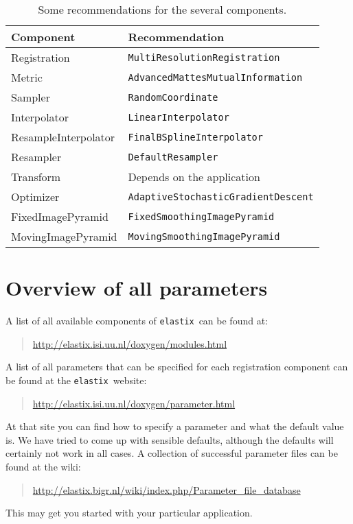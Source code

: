 \documentclass[]{report}
\newcommand{\elastix}{\texttt{elastix}}
\begin{document}
\begin{table}[htb]
\centering
\begin{tabular}{l|p{15em}}
\textbf{Component} & \textbf{Recommendation} \\
\hline
Registration & \texttt{MultiResolutionRegistration} \\
Metric       & \texttt{AdvancedMattesMutualInformation} \\
Sampler      & \texttt{RandomCoordinate} \\
Interpolator & \texttt{LinearInterpolator} \\
ResampleInterpolator & \texttt{FinalBSplineInterpolator} \\
Resampler    & \texttt{DefaultResampler}\\
Transform    & Depends on the application \\
Optimizer    & \texttt{AdaptiveStochasticGradientDescent} \\
FixedImagePyramid   & \texttt{FixedSmoothingImagePyramid} \\
MovingImagePyramid  & \texttt{MovingSmoothingImagePyramid} \\
\end{tabular}
\caption{Some recommendations for the several components.}\label{table:tutorial:components}
\end{table}

\section{Overview of all parameters}

A list of all available components of \elastix\ can be found at:
\begin{quote}
\url{http://elastix.isi.uu.nl/doxygen/modules.html}
\end{quote}
A list of all parameters that can be specified for each registration
component can be found at the \elastix\ website:
\begin{quote}
\url{http://elastix.isi.uu.nl/doxygen/parameter.html}
\end{quote}
At that site you can find how to specify a parameter and what the
default value is. We have tried to come up with sensible defaults,
although the defaults will certainly not work in all cases. A
collection of successful parameter files can be found at the wiki:
\begin{quote}
\url{http://elastix.bigr.nl/wiki/index.php/Parameter_file_database}
\end{quote}
This may get you started with your particular application.
\end{document}

